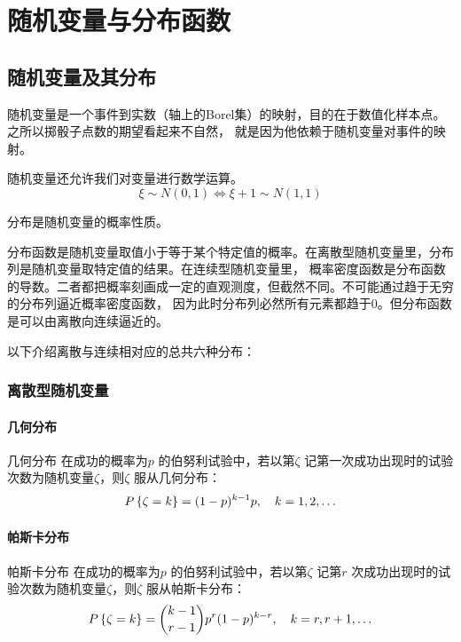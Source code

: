 \chapter{随机变量与分布函数}
\section{随机变量及其分布}
随机变量是一个事件到实数（轴上的Borel集）的映射，目的在于数值化样本点。之所以掷骰子点数的期望看起来不自然，
就是因为他依赖于随机变量对事件的映射。

随机变量还允许我们对变量进行数学运算。\[
    \xi \sim N(0,1) \iff \xi+1 \sim N(1,1)
\]

分布是随机变量的概率性质。

分布函数是随机变量取值小于等于某个特定值的概率。在离散型随机变量里，分布列是随机变量取特定值的结果。在连续型随机变量里，
概率密度函数是分布函数的导数。二者都把概率刻画成一定的直观测度，但截然不同。不可能通过趋于无穷的分布列逼近概率密度函数，
因为此时分布列必然所有元素都趋于0。但分布函数是可以由离散向连续逼近的。

以下介绍离散与连续相对应的总共六种分布：

\subsection{离散型随机变量}
\subsubsection{几何分布}

\begin{definition}{几何分布}
    在成功的概率为\(p\) 的伯努利试验中，若以第\(\zeta\)
    记第一次成功出现时的试验次数为随机变量\(\zeta\)，则\(\zeta\) 服从几何分布：
    \[
        \P{\zeta=k} = (1-p)^{k-1} p, \quad k=1,2,\ldots
    \]
\end{definition}


\subsubsection{帕斯卡分布}

\begin{definition}{帕斯卡分布}
    在成功的概率为\(p\) 的伯努利试验中，若以第\(\zeta\) 记第\(r\)
    次成功出现时的试验次数为随机变量\(\zeta\)，则\(\zeta\) 服从帕斯卡分布：
    \[
        \P{\zeta=k} = \binom{k-1}{r-1} p^r
        (1-p)^{k-r}, \quad k=r,r+1,\ldots
    \]
\end{definition}

